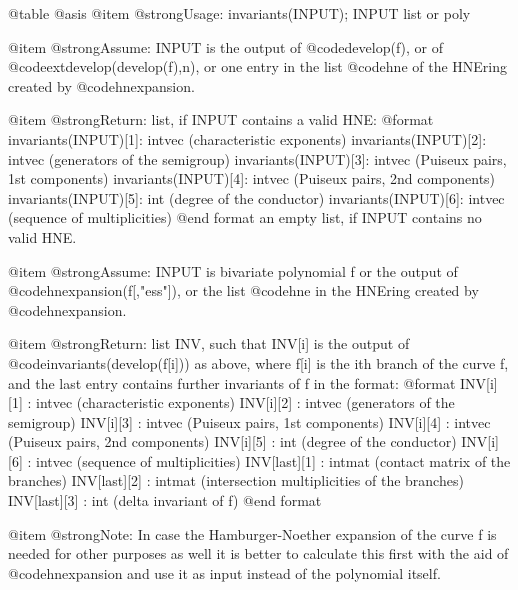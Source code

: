 @table @asis
@item @strong{Usage:}
invariants(INPUT); INPUT list or poly

@item @strong{Assume:}
INPUT is the output of @code{develop(f)}, or of
@code{extdevelop(develop(f),n)}, or one entry in the list @code{hne}
of the HNEring created by @code{hnexpansion}.

@item @strong{Return:}
list, if INPUT contains a valid HNE:
@format
    invariants(INPUT)[1]:  intvec    (characteristic exponents)
    invariants(INPUT)[2]:  intvec    (generators of the semigroup)
    invariants(INPUT)[3]:  intvec    (Puiseux pairs, 1st components)
    invariants(INPUT)[4]:  intvec    (Puiseux pairs, 2nd components)
    invariants(INPUT)[5]:  int       (degree of the conductor)
    invariants(INPUT)[6]:  intvec    (sequence of multiplicities)
@end format
an empty list, if INPUT contains no valid HNE.

@item @strong{Assume:}
INPUT is bivariate polynomial f or the output of @code{hnexpansion(f[,"ess"])},
or the list @code{hne} in the HNEring created by @code{hnexpansion}.

@item @strong{Return:}
list INV, such that INV[i] is the output of @code{invariants(develop(f[i]))}
as above, where f[i] is the ith branch of the curve f, and the last
entry contains further invariants of f in the format:
@format
    INV[i][1]    : intvec    (characteristic exponents)
    INV[i][2]    : intvec    (generators of the semigroup)
    INV[i][3]    : intvec    (Puiseux pairs, 1st components)
    INV[i][4]    : intvec    (Puiseux pairs, 2nd components)
    INV[i][5]    : int       (degree of the conductor)
    INV[i][6]    : intvec    (sequence of multiplicities)
    INV[last][1] : intmat    (contact matrix of the branches)
    INV[last][2] : intmat    (intersection multiplicities of the branches)
    INV[last][3] : int       (delta invariant of f)
@end format

@item @strong{Note:}
In case the Hamburger-Noether expansion of the curve f is needed
for other purposes as well it is better to calculate this first
with the aid of @code{hnexpansion} and use it as input instead of
the polynomial itself.

